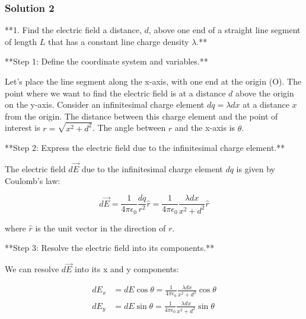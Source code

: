\documentclass{article}
\begin{document}
\subsubsection{Solution 2}
**1. Find the electric field a distance, \( d \), above one end of a straight line segment of length \( L \) that has a constant line charge density \( \lambda \).**

\begin{center}
\end{center}

**Step 1: Define the coordinate system and variables.**

Let's place the line segment along the x-axis, with one end at the origin (O). The point where we want to find the electric field is at a distance \(d\) above the origin on the y-axis. Consider an infinitesimal charge element \(dq = \lambda dx\) at a distance \(x\) from the origin. The distance between this charge element and the point of interest is \(r = \sqrt{x^2 + d^2}\). The angle between \(r\) and the x-axis is \(\theta\).

**Step 2: Express the electric field due to the infinitesimal charge element.**

The electric field \(d\vec{E}\) due to the infinitesimal charge element \(dq\) is given by Coulomb's law:

\begin{equation*}
d\vec{E} = \frac{1}{4\pi\epsilon_0} \frac{dq}{r^2} \hat{r} = \frac{1}{4\pi\epsilon_0} \frac{\lambda dx}{x^2 + d^2} \hat{r}
\end{equation*}

where \(\hat{r}\) is the unit vector in the direction of \(r\).

**Step 3: Resolve the electric field into its components.**

We can resolve \(d\vec{E}\) into its x and y components:

\begin{align*}
dE_x &= dE \cos\theta = \frac{1}{4\pi\epsilon_0} \frac{\lambda dx}{x^2 + d^2} \cos\theta \\
dE_y &= dE \sin\theta = \frac{1}{4\pi\epsilon_0} \frac{\lambda dx}{x^2 + d^2} \sin\theta
\end{align*}
\end{document}
